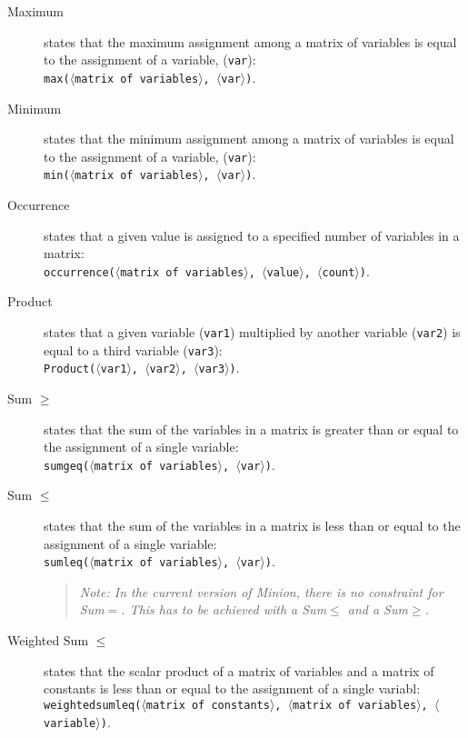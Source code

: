\documentclass{article}
\begin{document}
\begin{small}
\begin{description}
\item[Maximum] states that the maximum assignment among a matrix of
variables is equal to the assignment of a variable, (\texttt{var}):\\
\texttt{max($\langle$matrix of variables$\rangle$,
$\langle$var$\rangle$)}.

\item[Minimum] states that the minimum assignment among a matrix of
variables is equal to the assignment of a variable, (\texttt{var}):\\
\texttt{min($\langle$matrix of variables$\rangle$,
$\langle$var$\rangle$)}.

\item[Occurrence] states that a given value is assigned to a specified
number of variables in a matrix:\\ \texttt{occurrence($\langle$matrix
of variables$\rangle$, $\langle$value$\rangle$,
$\langle$count$\rangle$)}.

\item[Product] states that a given variable (\texttt{var1}) multiplied
by another variable (\texttt{var2}) is equal to a third variable
(\texttt{var3}):\\ \texttt{Product($\langle$var1$\rangle$,
$\langle$var2$\rangle$, $\langle$var3$\rangle$)}.

\item[Sum $\mathbf{\geq}$] states that the sum of the variables in a
matrix is greater than or equal to the assignment of a single
variable:\\ \texttt{sumgeq($\langle$matrix of variables$\rangle$,
$\langle$var$\rangle$)}.

\item[Sum $\mathbf{\leq}$] states that the sum of the variables in a
matrix is less than or equal to the assignment of a single variable:\\
\texttt{sumleq($\langle$matrix of variables$\rangle$,
$\langle$var$\rangle$)}.

\begin{quote}
{\em Note: In the current version of {\sc Minion}, there is no 
constraint for Sum$=$.  This has to be achieved with a 
Sum$\mathbf{\leq}$ and a 
Sum$\mathbf{\geq}$.}
\end{quote}

\item[Weighted Sum $\mathbf{\leq}$] states that the scalar product of
a matrix of variables and a matrix of constants is less than or equal
to the assignment of a single variabl:\\
\texttt{weightedsumleq($\langle$matrix of constants$\rangle$,
$\langle$matrix of variables$\rangle$, $\langle$variable$\rangle$)}.


\end{description}
\end{small}
\end{document}
